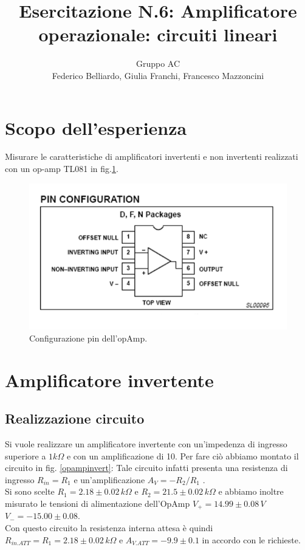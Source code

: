\documentclass[10pt,a4paper]{article}
\author{Gruppo AC \\ Federico Belliardo, Giulia Franchi, Francesco Mazzoncini}
\title{Esercitazione N.6: Amplificatore operazionale: circuiti lineari}
\begin{document}
\maketitle
\section{Scopo dell'esperienza}

Misurare le caratteristiche di amplificatori invertenti e non invertenti realizzati con un op-amp TL081 in fig.\ref{pin}.
\begin{figure}[!htb]
  \centering
  \includegraphics[scale=0.5]{pinrelaz6.png}
\caption{Configurazione pin dell'opAmp.}
\label{pin}
\end{figure}

\section{Amplificatore invertente}
\subsection{Realizzazione circuito}
Si vuole realizzare un amplificatore invertente con un'impedenza di ingresso superiore a $1k\Omega$ e con un amplificazione di 10. 
Per fare ciò abbiamo montato il circuito in fig. \ref{opampinvert}: Tale circuito infatti presenta una  resistenza di ingresso $R_{in}=R_1$ e un'amplificazione  $A_V=-R_2/R_1$ .\\
Si sono scelte $R_1=2.18 \pm 0.02 \, k\Omega$ e $R_2=21.5 \pm0.02 \, k\Omega$ e abbiamo inoltre misurato le  tensioni di alimentazione dell'OpAmp $V_+=14.99 \pm 0.08 \, V$ $V_-=-15.00 \pm 0.08$.\\
Con questo circuito la resistenza interna attesa è quindi $R_{in.ATT}= R_1 = 2.18 \pm 0.02 \, k\Omega$ e $A_{V.ATT}= -9.9 \pm 0.1$ in accordo con le richieste.\\
\end{document}
